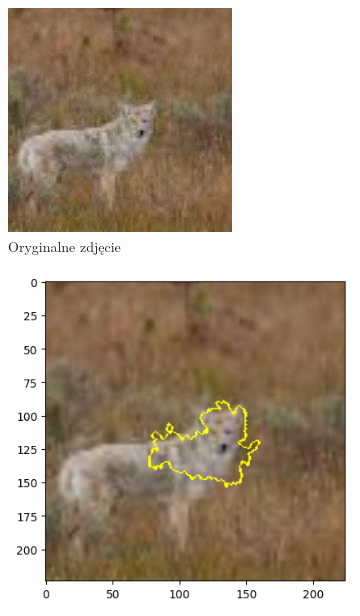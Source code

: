 \begin{figure}[h]
	\centering
	\begin{subfigure}[b]{0.3\textwidth}
		\includegraphics[width=.9\textwidth]{img/examples/appendix/n02114855_39555}
		\caption{Oryginalne zdjęcie}  \label{}
	\end{subfigure}
	\begin{subfigure}[b]{0.3\textwidth}
		\centering\includegraphics[width=.9\textwidth]{img/examples/appendix/n02114855_39555_lime}

\end{subfigure}
\end{figure}
